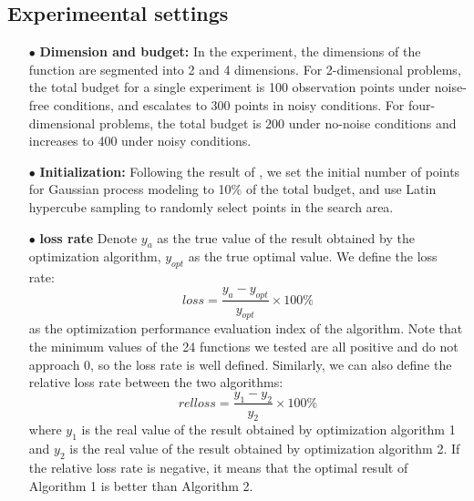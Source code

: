 \documentclass{article}
\begin{document}
\subsection{Experimeental settings}
\begin{itemize}[itemsep=4pt,topsep=0pt,parsep=0pt]
\item[$\bullet$] \textbf{Dimension and budget:} In the experiment, the dimensions of the function are segmented into 2 and 4 dimensions. For 2-dimensional problems, the total budget for a single experiment is 100 observation points under noise-free conditions, and escalates to 300 points in noisy conditions. For four-dimensional problems, the total budget is 200 under no-noise conditions and increases to 400 under noisy conditions.
\item[$\bullet$] \textbf{Initialization:} Following the result of \citep{Bossek2020Initial}, we set the initial number of points for Gaussian process modeling to 10$\%$ of the total budget, and use Latin hypercube sampling to randomly select points in the search area.
\item[$\bullet$] \textbf{loss rate} Denote $y_a$ as the true value of the result obtained by the optimization algorithm, $y_{opt}$ as the true optimal value. We define the loss rate:
\begin{equation}\label{eq9}
	loss = \frac{y_a - y_{opt}}{y_{opt}}\times 100\%
\end{equation}
 as the optimization performance evaluation index of the algorithm. Note that the minimum values of the 24 functions we tested are all positive and do not approach 0, so the loss rate is well defined. Similarly, we can also define the relative loss rate between the two algorithms:
\begin{equation}\label{eq10}
	relloss = \frac{y_1 - y_2}{y_2}\times 100\%
\end{equation}
 where $y_1$ is the real value of the result obtained by optimization algorithm 1 and $y_2$ is the real value of the result obtained by optimization algorithm 2. If the relative loss rate is negative, it means that the optimal result of Algorithm 1 is better than Algorithm 2.


\end{itemize}
\end{document}
